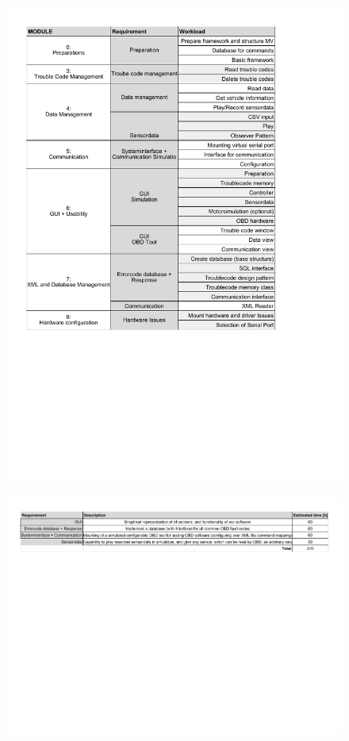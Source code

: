 \begin{figure}[h!]
\includegraphics[width=\paperwidth]{externaldocuments/Requirements-Detailed_Design.pdf} 
\end{figure}
\begin{landscape}
 \begin{figure}[h!]
  \includegraphics[width=\paperwidth]{externaldocuments/Requirements_OBCU-ACQ11Technical_Requirements.pdf}
 \end{figure}
\end{landscape}
